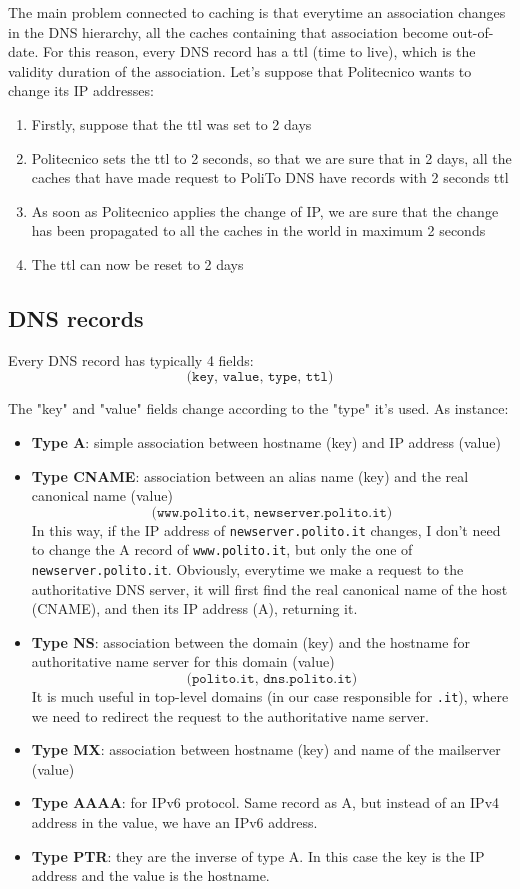 The main problem connected to caching is that everytime an association changes in the DNS hierarchy, all the caches containing that association become out-of-date. For this reason, every DNS record has a ttl (time to live), which is the validity duration of the association. Let's suppose that Politecnico wants to change its IP addresses:
\begin{enumerate}
    \item Firstly, suppose that the ttl was set to 2 days
    \item Politecnico sets the ttl to 2 seconds, so that we are sure that in 2 days, all the caches that have made request to PoliTo DNS have records with 2 seconds ttl
    \item As soon as Politecnico applies the change of IP, we are sure that the change has been propagated to all the caches in the world in maximum 2 seconds
    \item The ttl can now be reset to 2 days
\end{enumerate}

\subsection{DNS records}
Every DNS record has typically 4 fields:
\[\texttt{(key, value, type, ttl)}\]

\noindent The "key" and "value" fields change according to the "type" it's used. As instance:
\begin{itemize}
    \item \textbf{Type A}: simple association between hostname (key) and IP address (value)
    \item \textbf{Type CNAME}: association between an alias name (key) and the real canonical name (value)
    \[\texttt{(www.polito.it, newserver.polito.it)}\]
    In this way, if the IP address of \texttt{newserver.polito.it} changes, I don't need to change the A record of \texttt{www.polito.it}, but only the one of \texttt{newserver.polito.it}. Obviously, everytime we make a request to the authoritative DNS server, it will first find the real canonical name of the host (CNAME), and then its IP address (A), returning it.
    \item \textbf{Type NS}: association between the domain (key) and the hostname for authoritative name server for this domain (value)
    \[\texttt{(polito.it, dns.polito.it)}\]
    It is much useful in top-level domains (in our case responsible for \texttt{.it}), where we need to redirect the request to the authoritative name server.
    \item \textbf{Type MX}: association between hostname (key) and name of the mailserver (value)
    \item \textbf{Type AAAA}: for IPv6 protocol. Same record as A, but instead of an IPv4 address in the value, we have an IPv6 address.
    \item \textbf{Type PTR}: they are the inverse of type A. In this case the key is the IP address and the value is the hostname.

\end{itemize}

